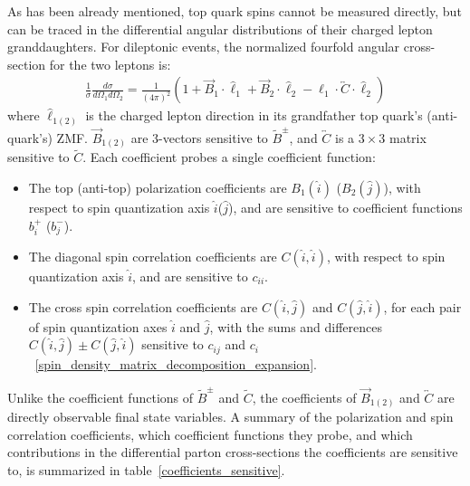 As has been already mentioned, top quark spins cannot be measured directly, but can be traced in the differential angular distributions of their charged lepton granddaughters.
For \ttbar dileptonic events, the normalized fourfold angular cross-section for the two leptons is:
\begin{align}
\frac{1}{\sigma} \frac{d \sigma}{d \Omega_1 d \Omega_2}=\frac{1}{(4 \pi)^2}\left(1+\vec{B}_1 \cdot \hat{\ell}_1+\vec{B}_2 \cdot \hat{\ell}_2-\hat{\ell}_1 \cdot \overleftrightarrow{C} \cdot \hat{\ell}_2\right)
\label{fourfold_angular_distribution}
\end{align}
where $\hat{\ell}_{1(2)}$ is the charged lepton direction in its grandfather top quark's (anti-quark's) ZMF.
$\vec{B}_{1(2)}$ are 3-vectors sensitive to $\tilde{B}^\pm$, and $\overleftrightarrow{C}$ is a $3\times3$ matrix sensitive to $\tilde{C}$.
Each coefficient probes a single coefficient function:
\begin{itemize}
\item The top (anti-top) polarization coefficients are $B_{1}(\hat{i})$ ($B_{2}(\hat{j})$), with respect to spin quantization axis $\hat{i}$($\hat{j}$), and are sensitive to coefficient functions $b^+_i$ ($b^-_j$).
\item The diagonal spin correlation coefficients are $C(\hat{i},\hat{i})$, with respect to spin quantization axis $\hat{i}$, and are sensitive to $c_{ii}$.
\item The cross spin correlation coefficients are $C(\hat{i},\hat{j})$ and $C(\hat{j},\hat{i})$,  for each pair of spin quantization axes $\hat{i}$ and $\hat{j}$, with the sums and differences $C(\hat{i},\hat{j}) \pm C(\hat{j},\hat{i})$ sensitive to $c_{ij}$ and $c_{i}$~\ref{spin_density_matrix_decomposition_expansion}.
\end{itemize}
Unlike the coefficient functions of $\tilde{B}^\pm$ and $\tilde{C}$, the coefficients of $\vec{B}_{1(2)}$ and $\overleftrightarrow{C}$ are directly observable final state variables.
A summary of the polarization and spin correlation coefficients, which coefficient functions they probe, and which contributions in the differential parton cross-sections the coefficients are sensitive to, is summarized in table~\ref{coefficients_sensitive}.
